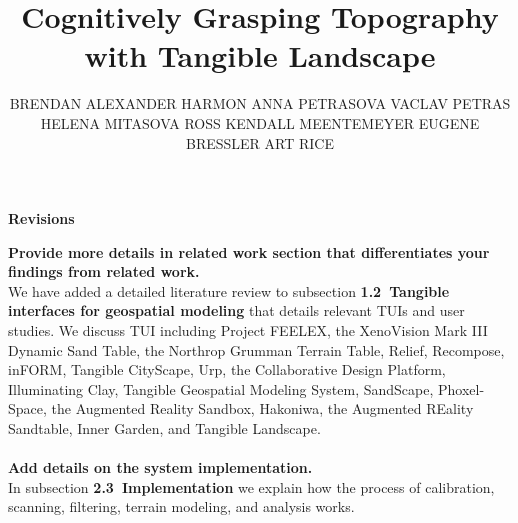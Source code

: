 \documentclass[prodmode,acmtochi]{acmsmall} %
\begin{document}

\title{Cognitively Grasping Topography with Tangible Landscape}
\author{BRENDAN ALEXANDER HARMON
ANNA PETRASOVA
VACLAV PETRAS
HELENA MITASOVA
ROSS ​KENDALL MEENTEMEYER
EUGENE BRESSLER
ART RICE
}

\maketitle

\textbf{Revisions}

\vspace*{3em}

%
%

\textbf{Provide more details in related work section 
that differentiates your findings from related work.} \\

We have added a detailed literature review to subsection 
\textbf{1.2~Tangible interfaces for geospatial modeling}
that details relevant TUIs and user studies.
We discuss TUI including 
Project FEELEX, 
the XenoVision Mark III Dynamic Sand Table,  
the Northrop Grumman Terrain Table, 
Relief, Recompose, inFORM, Tangible CityScape,
Urp, the Collaborative Design Platform, 
Illuminating Clay, Tangible Geospatial Modeling System, 
SandScape, Phoxel-Space, 
the Augmented Reality Sandbox,
Hakoniwa, the Augmented REality Sandtable,
Inner Garden, and Tangible Landscape. \\

\hrulefill \\

\textbf{Add details on the system implementation.} \\

In subsection \textbf{2.3~Implementation} 
we explain how the process of calibration, scanning, filtering,
terrain modeling, and analysis works. \\
\end{document}
